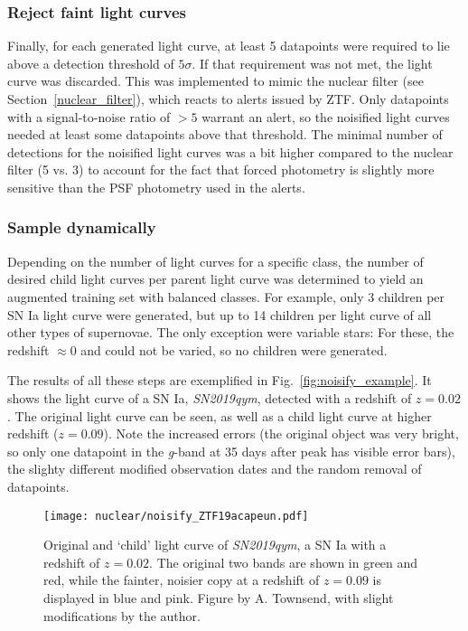 \subsubsection{Reject faint light curves}
Finally, for each generated light curve, at least 5 datapoints were required to lie above a detection threshold of $5 \sigma$. If that requirement was not met, the light curve was discarded. This was implemented to mimic the nuclear filter (see Section~\ref{nuclear_filter}), which reacts to alerts issued by ZTF. Only datapoints with a signal-to-noise ratio of $>5$ warrant an alert, so the noisified light curves needed at least some datapoints above that threshold. The minimal number of detections for the noisified light curves was a bit higher compared to the nuclear filter (5 vs. 3) to account for the fact that forced photometry is slightly more sensitive than the PSF photometry used in the alerts.

\subsubsection{Sample dynamically}
Depending on the number of light curves for a specific class, the number of desired child light curves per parent light curve was determined to yield an augmented training set with balanced classes. For example, only 3 children per SN Ia light curve were generated, but up to 14 children per light curve of all other types of supernovae. The only exception were variable stars: For these, the redshift $\approx 0$ and could not be varied, so no children were generated.

The results of all these steps are exemplified in Fig.~\ref{fig:noisify_example}. It shows the light curve of a SN Ia, \textit{SN2019qym}, detected with a redshift of $z=0.02$. The original light curve can be seen, as well as a child light curve at higher redshift ($z=0.09$). Note the increased errors (the original object was very bright, so only one datapoint in the \textit{g}-band at 35 days after peak has visible error bars), the slighty different modified observation dates and the random removal of datapoints.

\begin{figure}[H]
  \texttt{[image: nuclear/noisify\_ZTF19acapeun.pdf]}
  \caption[Augmentation example]{Original and `child' light curve of \textit{SN2019qym}, a SN Ia with a redshift of $z=0.02$. The original two bands are shown in green and red, while the fainter, noisier copy at a redshift of $z=0.09$ is displayed in blue and pink. Figure by A. Townsend, with slight modifications by the author.}
\end{figure}


